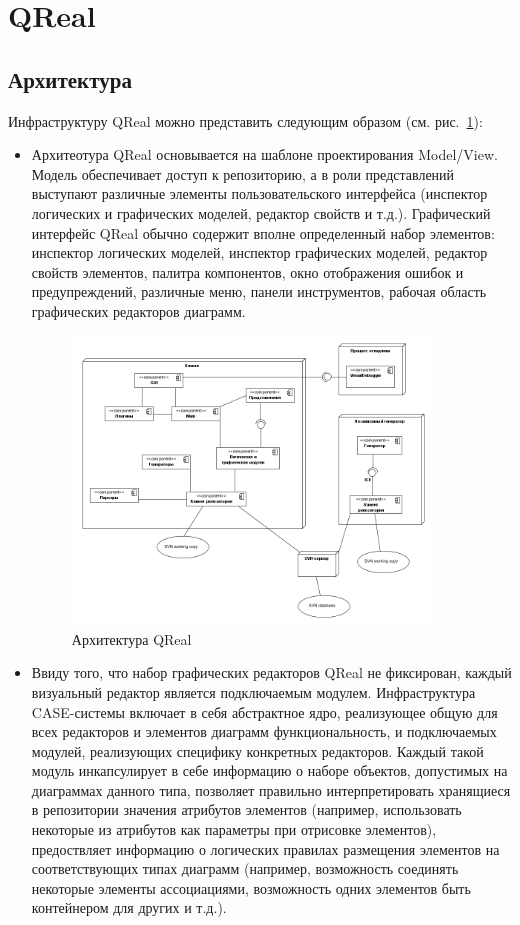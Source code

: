 \documentclass[a4paper]{article}
\begin{document}
\section{QReal}

\subsection{Архитектура}
Инфраструктуру QReal можно представить следующим образом (см. рис.~\ref{qRealArchitecture}):

\begin{itemize}
  \item Архитеотура QReal основывается на шаблоне проектирования Model/View. Модель обеспечивает доступ к репозиторию, а в роли представлений выступают различные элементы пользовательского интерфейса (инспектор логических и графических моделей, редактор свойств и т.д.). Графический интерфейс QReal обычно содержит вполне определенный набор элементов: инспектор логических моделей, инспектор графических моделей, редактор свойств элементов, палитра компонентов, окно отображения ошибок и предупреждений, различные меню, панели инструментов, рабочая область графических редакторов диаграмм.
\begin{figure} [ht]
  \begin{center}
    \includegraphics[width=0.9\textwidth]{01-architecture.png}
    \caption{Архитектура QReal}
    \label{qRealArchitecture}
  \end{center}
\end{figure}
  \item Ввиду того, что набор графических редакторов QReal не фиксирован, каждый визуальный редактор является подключаемым модулем. Инфраструктура CASE-системы включает в себя абстрактное ядро, реализующее общую для всех редакторов и элементов диаграмм функциональность, и подключаемых модулей, реализующих специфику конкретных редакторов. Каждый такой модуль инкапсулирует в себе информацию о наборе объектов, допустимых на диаграммах данного типа, позволяет правильно интерпретировать хранящиеся в репозитории значения атрибутов элементов (например, использовать некоторые из атрибутов как параметры при отрисовке элементов), предоствляет информацию о логических правилах размещения элементов на соответствующих типах диаграмм (например, возможность соединять некоторые элементы ассоциациями, возможность одних элементов быть контейнером для других и т.д.).

\end{itemize}
\end{document}
